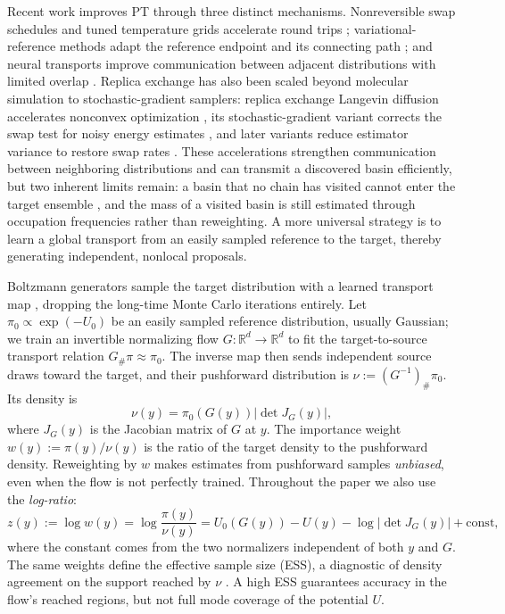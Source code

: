 \documentclass{article}
\begin{document}
Recent work improves PT through three distinct mechanisms. Nonreversible swap schedules and tuned temperature grids accelerate round trips \citep{syed2022nonreversible}; variational-reference methods adapt the reference endpoint and its connecting path \citep{surjanovic2022variational}; and neural transports improve communication between adjacent distributions with limited overlap \citep{zhang2025accelerated}. Replica exchange has also been scaled beyond molecular simulation to stochastic-gradient samplers: replica exchange Langevin diffusion accelerates nonconvex optimization \citep{chen2019accelerating,dong2021replica}, its stochastic-gradient variant corrects the swap test for noisy energy estimates \citep{deng2020nonconvex}, and later variants reduce estimator variance to restore swap rates \citep{deng2021variance}. These accelerations strengthen communication between neighboring distributions and can transmit a discovered basin efficiently, but two inherent limits remain: a basin that no chain has visited cannot enter the target ensemble \citep{woodard2009conditions,chehab2024provable}, and the mass of a visited basin is still estimated through occupation frequencies rather than reweighting.
A more universal strategy is to learn a global transport from an easily sampled reference to the target, thereby generating independent, nonlocal proposals.

Boltzmann generators sample the target distribution with a learned transport map \citep{noe2019boltzmann}, dropping the long-time Monte Carlo iterations entirely. Let $\pi_0\propto\exp(-U_0)$ be an easily sampled reference distribution, usually Gaussian; we train an invertible normalizing flow $G:\mathbb R^d\to\mathbb R^d$ \citep{rezende2015variational,papamakarios2017masked,kingma2018glow} to fit the target-to-source transport relation $G_{\#}\pi\approx\pi_0$. The inverse map then sends independent source draws toward the target, and their pushforward distribution is $\nu:=(G^{-1})_{\#}\pi_0$. Its density is
\begin{equation}
    \nu(y)=\pi_0(G(y))\left|\det J_G(y)\right|,
    \label{eq: pushforward-density}
\end{equation}
where $J_G(y)$ is the Jacobian matrix of $G$ at $y$. The importance weight $w(y):=\pi(y)/\nu(y)$ is the ratio of the target density to the pushforward density. Reweighting by $w$ makes estimates from pushforward samples \emph{unbiased}, even when the flow is not perfectly trained. Throughout the paper we also use the \emph{log-ratio}:
\begin{equation}
	z(y) := \log w(y) = \log \frac{\pi(y)}{\nu(y)} =  U_0(G(y)) - U(y) - \log|\det J_G(y)| + \mathrm{const},
	\label{eq: log-ratio}
\end{equation}
where the constant comes from the two normalizers independent of both $y$ and $G$. The same weights define the effective sample size (ESS), a diagnostic of density agreement on the support reached by $\nu$ \citep{liu2001monte,doucet2001introduction,martino2017rethinking}. A high ESS guarantees accuracy in the flow's reached regions, but not full mode coverage of the potential $U$.
\end{document}
